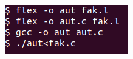 \begin{multicols}{2}
\begin{figure}
    \includegraphics[width=\linewidth]{bilder/flex_command.png}
    \label{fig:flex}
\end{figure}


\end{multicols}
